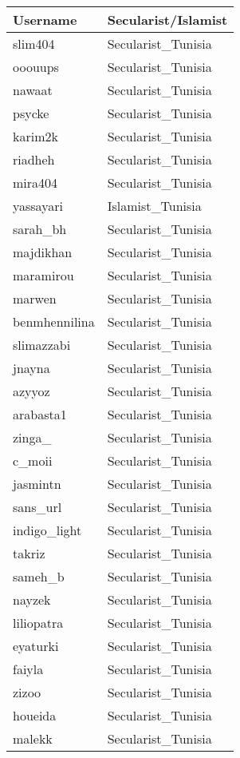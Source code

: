 \begin{longtable}{ll}
  \toprule
Username & Secularist/Islamist \\ 
  \midrule
slim404 & Secularist\_Tunisia \\ 
  ooouups & Secularist\_Tunisia \\ 
  nawaat & Secularist\_Tunisia \\ 
  psycke & Secularist\_Tunisia \\ 
  karim2k & Secularist\_Tunisia \\ 
  riadheh & Secularist\_Tunisia \\ 
  mira404 & Secularist\_Tunisia \\ 
  yassayari & Islamist\_Tunisia \\ 
  sarah\_bh & Secularist\_Tunisia \\ 
  majdikhan & Secularist\_Tunisia \\ 
  maramirou & Secularist\_Tunisia \\ 
  marwen & Secularist\_Tunisia \\ 
  benmhennilina & Secularist\_Tunisia \\ 
  slimazzabi & Secularist\_Tunisia \\ 
  jnayna & Secularist\_Tunisia \\ 
  azyyoz & Secularist\_Tunisia \\ 
  arabasta1 & Secularist\_Tunisia \\ 
  zinga\_ & Secularist\_Tunisia \\ 
  c\_moii & Secularist\_Tunisia \\ 
  jasmintn & Secularist\_Tunisia \\ 
  sans\_url & Secularist\_Tunisia \\ 
  indigo\_light & Secularist\_Tunisia \\ 
  takriz & Secularist\_Tunisia \\ 
  sameh\_b & Secularist\_Tunisia \\ 
  nayzek & Secularist\_Tunisia \\ 
  liliopatra & Secularist\_Tunisia \\ 
  eyaturki & Secularist\_Tunisia \\ 
  faiyla & Secularist\_Tunisia \\ 
  zizoo & Secularist\_Tunisia \\ 
  houeida & Secularist\_Tunisia \\ 
  malekk & Secularist\_Tunisia \\ 

\end{longtable}
